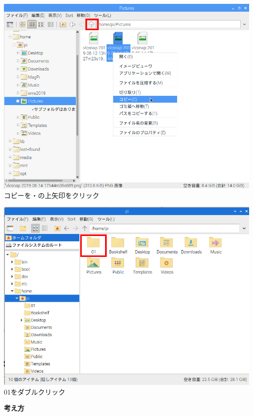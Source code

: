 \begin{minipage}{0.45\linewidth}
  \includegraphics[width=\linewidth]{text01-img/textbook-img163.png}
   コピーを・の上矢印をクリック
\end{minipage}
\hspace{10mm}
\begin{minipage}{0.45\linewidth}
  \includegraphics[width=\linewidth]{text01-img/textbook-img167.png}
   01をダブルクリック
\end{minipage}

\clearpage
\flushleft

\textbf{考え方}


